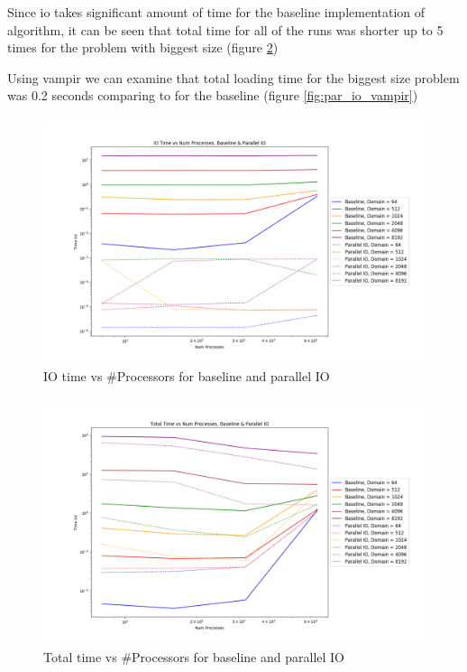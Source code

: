 \begin{enumerate}
  Since io takes significant amount of time for the baseline implementation of algorithm, it can be seen that 
  total time for all of the runs was shorter up to 5 times for the problem with biggest size (figure 
  \ref{fig:par_io_total_vs_proc})

  Using vampir we can examine that total loading time for the biggest size problem was 0.2 seconds comparing to  %
  for the baseline (figure \ref{fig:par_io_vampir})

  \begin{figure}[p] %
    \begin{center}
      \includegraphics[width=.9\linewidth]{Figures/io/io_multdomain_haswell_io_baseline.png} %
      \caption{IO time vs #Processors for baseline and parallel IO}
      \label{fig:par_io_io_vs_proc}
    \end{center}
 \end{figure}
 
 \begin{figure}[p] %
   \begin{center}
     \includegraphics[width=.9\linewidth]{Figures/io/total_multdomain_haswell_io_baseline.png} %
     \caption{Total time vs #Processors for baseline and parallel IO}
     \label{fig:par_io_total_vs_proc}
   \end{center}
 \end{figure}
 

\end{enumerate}
